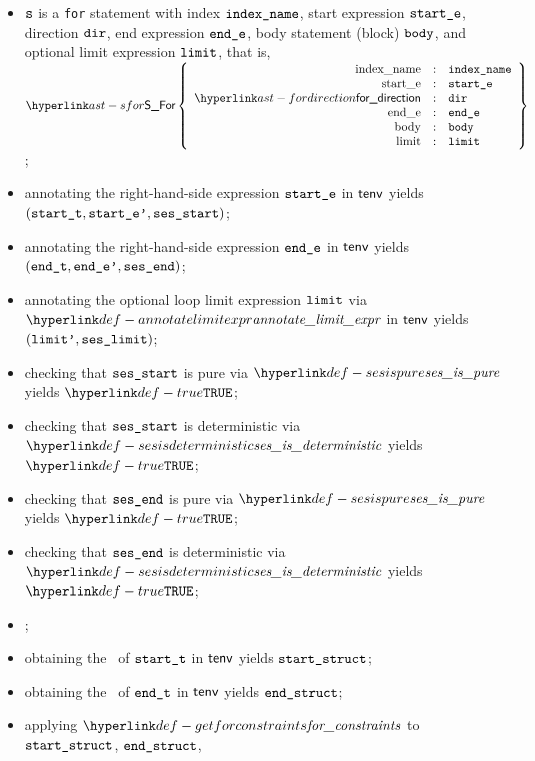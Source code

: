 \ProseParagraph
\AllApply
\begin{itemize}
  \item $\texttt{s}$ is a \texttt{for} statement with index $\texttt{index\_name}$,
        start expression $\texttt{start\_e}$,
        direction $\texttt{dir}$,
        end expression $\texttt{end\_e}$,
        body statement (block) $\texttt{body}$,
        and optional limit expression $\texttt{limit}$,
        that is, $\SFor\left\{\begin{array}{rcl}
          \Forindexname &:& \vindexname\\
          \Forstarte &:& \vstarte\\
          \fordirection &:& \vdir\\
          \Forende &:& \vende\\
          \Forbody &:& \vbody\\
          \Forlimit &:& \vlimit
        \end{array}\right\}$;
  \item annotating the right-hand-side expression $\texttt{start\_e}$ in $\textsf{tenv}$ yields \\
        $(\texttt{start\_t}, \texttt{start\_e'}, \texttt{ses\_start})$\ProseOrTypeError;
  \item annotating the right-hand-side expression $\texttt{end\_e}$ in $\textsf{tenv}$ yields \\ $(\texttt{end\_t}, \texttt{end\_e'}, \texttt{ses\_end})$\ProseOrTypeError;
  \item annotating the optional loop limit expression $\texttt{limit}$ via $\annotatelimitexpr$ in $\textsf{tenv}$
        yields $(\texttt{limit'}, \texttt{ses\_limit})$\ProseOrTypeError;
  \item checking that $\texttt{ses\_start}$ is pure via $\sesispure$ yields $\True$\ProseOrTypeError;
  \item checking that $\texttt{ses\_start}$ is deterministic via $\sesisdeterministic$ yields $\True$\ProseOrTypeError;
  \item checking that $\texttt{ses\_end}$ is pure via $\sesispure$ yields $\True$\ProseOrTypeError;
  \item checking that $\texttt{ses\_end}$ is deterministic via $\sesisdeterministic$ yields $\True$\ProseOrTypeError;
  \item {};
  \item obtaining the \underlyingtype\ of $\texttt{start\_t}$ in $\textsf{tenv}$ yields $\texttt{start\_struct}$\ProseOrTypeError;
  \item obtaining the \underlyingtype\ of $\texttt{end\_t}$ in $\textsf{tenv}$ yields $\texttt{end\_struct}$\ProseOrTypeError;
  \item applying $\getforconstraints$ to $\texttt{start\_struct}$, $\texttt{end\_struct}$,

\end{itemize}
